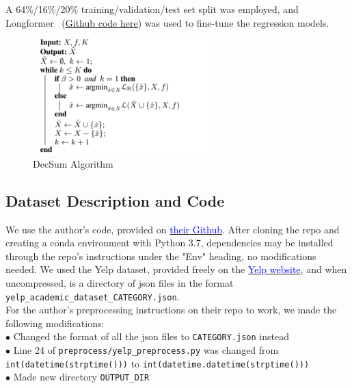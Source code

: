 \documentclass{article}
\newcommand{\blue}[1]{\textcolor{blue}{#1}}
\begin{document}
A 64\%/16\%/20\% training/validation/test set split was employed, and Longformer~\cite{beltagy2020longformer} (\href{https://github.com/allenai/longformer}{Github code here}) was used to fine-tune the
regression models.

\begin{figure}[!ht]
    \centering
    \includegraphics[scale=1]{../assets/DecSum_Algo}
    \caption{DecSum Algorithm}
    \label{fig:1}
\end{figure}



\subsection{Dataset Description and Code}
We use the author’s code, provided on \href{https://github.com/ChicagoHAI/decsum}{\blue{their Github}}. After cloning the repo and creating a conda environment with Python 3.7,
dependencies may be installed through the repo's instructions under the "Env" heading, no modifications needed. We used the Yelp dataset, provided freely on the
\href{https://www.yelp.com/dataset/download}{\blue{Yelp website}}, and when uncompressed, is a directory of json files in the format \texttt{yelp\_academic\_dataset\_CATEGORY.json}. \\

For the author's preprocessing instructions on their repo to work, we made the following modifications: \\
$\bullet$ Changed the format of all the json files to \texttt{CATEGORY.json} instead \\
$\bullet$ Line 24 of \texttt{preprocess/yelp\_preprocess.py} was changed from \texttt{int(datetime(strptime()))} to \texttt{int(datetime.datetime(strptime()))} \\
$\bullet$ Made new directory \texttt{OUTPUT\_DIR} \\
\end{document}
